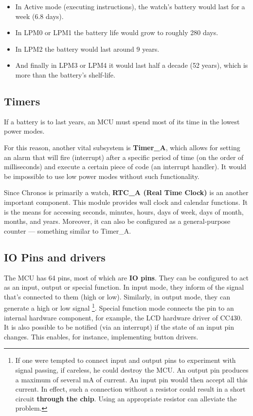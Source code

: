 \begin{itemize}
    \item In Active mode (executing instructions), the watch's battery
      would last for a week (6.8 days).
    \item In LPM0 or LPM1 the battery life would grow to roughly 280 days.
    \item In LPM2 the battery would last around 9 years.
    \item And finally in LPM3 or LPM4 it would last half a decade (52
    years), which is more than the battery's shelf-life.
\end{itemize}

\subsection{Timers}
If a battery is to last years, an MCU must spend most of its time in
the lowest power modes.

For this reason, another vital subsystem is {\bf Timer\_A}, which
allows for setting an alarm that will fire (interrupt) after a specific
period of time (on the order of milliseconds) and execute a certain
piece of code (an interrupt handler). It would be impossible to use low
power modes without such functionality.

Since Chronos is primarily a watch, {\bf RTC\_A (Real Time Clock)} is
an another important component. This module provides wall clock and
calendar functions. It is the means for accessing seconds, minutes,
hours, days of week, days of month, months, and years.  Moreover, it
can also be configured as a general-purpose counter --- something
similar to Timer\_A.

\subsection{IO Pins and drivers}
The MCU has 64 pins, most of which are {\bf IO pins}. They can be
configured to act as an input, output or special function.  In input
mode, they inform of the signal that's connected to them (high or
low). Similarly, in output mode, they can generate a high or low
signal \footnote{If one were tempted to connect input and output pins
to experiment with signal passing, if careless, he could destroy the
MCU.  An output pin produces a maximum of several mA of current. An
input pin would then accept all this current. In effect, such a
connection without a resistor could result in a short circuit {\bf
through the chip}. Using an appropriate resistor can alleviate the
problem.}. Special function mode connects the pin to an internal
hardware component, for example, the LCD hardware driver of CC430.  It is also possible
to be notified (via an interrupt) if the state of an input pin changes.
This enables, for instance, implementing button drivers.

